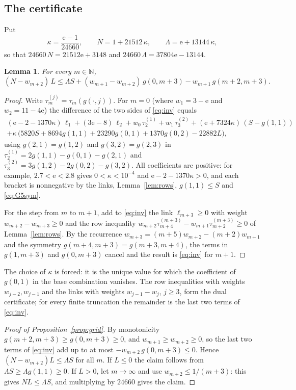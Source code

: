 \documentclass[11pt]{amsart}
\newtheorem{lemma}[theorem]{Lemma}
\theoremstyle{definition}
\theoremstyle{remark}
\numberwithin{equation}{section}
\newcommand{\N}{\mathbb{N}}
\newcommand{\e}{\mathrm{e}}
\begin{document}
\subsection{The certificate}
Put
\[
  \kappa=\frac{\e-1}{24660},\qquad N=1+21512\,\kappa,\qquad \Lambda=\e+13144\,\kappa ,
\]
so that $24660\,N=21512\e+3148$ and $24660\,\Lambda=37804\e-13144$.

\begin{lemma}\label{lem:invariant}
For every $m\in\N$,
\begin{equation}\label{eq:inv}
  (N-w_{m+2})\,L\le\Lambda S+(w_{m+1}-w_{m+2})\,g(0,m+3)-w_{m+1}\,g(m+2,m+3).
\end{equation}
\end{lemma}

\begin{proof}
Write $\tau^{(j)}_m=\tau_m(g(\cdot,j))$. For $m=0$ (where $w_1=3-\e$ and $w_2=11-4\e$) the
difference of the two sides of \eqref{eq:inv} equals
\begin{multline*}
 (\e-2-1370\kappa)\,\ell_1+(3\e-8)\,\ell_2+w_0\,\tau^{(1)}_2+w_1\,\tau^{(2)}_3
 +(\e+7324\kappa)\,(S-g(1,1))\\
 +\kappa\,\bigl(5820S+8694g(1,1)+23290g(0,1)+1370g(0,2)-22882L\bigr),
\end{multline*}
using $g(2,1)=g(1,2)$ and $g(3,2)=g(2,3)$ in $\tau^{(1)}_2=2g(1,1)-g(0,1)-g(2,1)$ and
$\tau^{(2)}_3=3g(1,2)-2g(0,2)-g(3,2)$. All coefficients are positive: for example,
$2.7<\e<2.8$ gives $0<\kappa<10^{-4}$ and
$\e-2-1370\kappa>0$, and each
bracket is nonnegative by the links, Lemma~\ref{lem:rows}, $g(1,1)\le S$ and \eqref{eq:G5sym}.

For the step from $m$ to $m+1$, add to \eqref{eq:inv} the link $\ell_{m+3}\ge0$ with weight
$w_{m+2}-w_{m+3}\ge0$ and the row inequality
$w_{m+2}\tau^{(m+3)}_{m+4}-w_{m+1}\tau^{(m+3)}_{m+2}\ge0$ of Lemma~\ref{lem:rows}. By the
recurrence $w_{m+3}=(m+5)w_{m+2}-(m+2)w_{m+1}$ and the symmetry $g(m+4,m+3)=g(m+3,m+4)$, the
terms in $g(1,m+3)$ and $g(0,m+3)$ cancel and the result is \eqref{eq:inv} for $m+1$.
\end{proof}

The choice of $\kappa$ is forced: it is the unique value for which the coefficient of $g(0,1)$ in
the base combination vanishes. The row inequalities with weights $w_{j-2},w_{j-1}$ and the links
with weights $w_{j-1}-w_j$, $j\ge3$, form the dual certificate; for every finite truncation the
remainder is the last two terms of \eqref{eq:inv}.

\begin{proof}[Proof of Proposition~\ref{prop:grid}]
By monotonicity $g(m+2,m+3)\ge g(0,m+3)\ge0$, and $w_{m+1}\ge w_{m+2}\ge0$, so the last two terms of
\eqref{eq:inv} add up to at most $-w_{m+2}\,g(0,m+3)\le0$. Hence $(N-w_{m+2})L\le\Lambda S$ for all
$m$. If $L\le0$ the claim follows from $\Lambda S\ge\Lambda g(1,1)\ge0$. If $L>0$, let $m\to\infty$
and use $w_{m+2}\le1/(m+3)$: this gives $NL\le\Lambda S$, and multiplying by $24660$ gives the
claim.
\end{proof}
\end{document}
